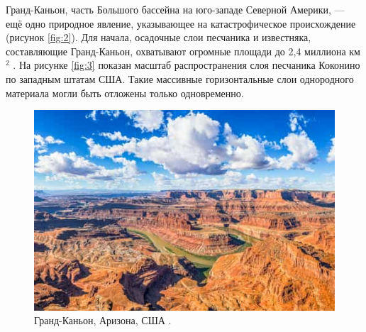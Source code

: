 \documentclass[10pt,twocolumn,letterpaper]{article}
\begin{document}
Гранд-Каньон, часть Большого бассейна на юго-западе Северной Америки, — ещё одно природное явление, указывающее на катастрофическое происхождение (рисунок \ref{fig:2}). Для начала, осадочные слои песчаника и известняка, составляющие Гранд-Каньон, охватывают огромные площади до 2,4 миллиона км$^2$ \cite{21}. На рисунке \ref{fig:3} показан масштаб распространения слоя песчаника Коконино по западным штатам США. Такие массивные горизонтальные слои однородного материала могли быть отложены только одновременно.

\begin{figure}[b]
\begin{center}
   \includegraphics[width=1\linewidth]{grand-canyon.jpg}
\end{center}
   \caption{Гранд-Каньон, Аризона, США \cite{49}.}
\label{fig:2}
\label{fig:onecol}
\end{figure}
\end{document}
